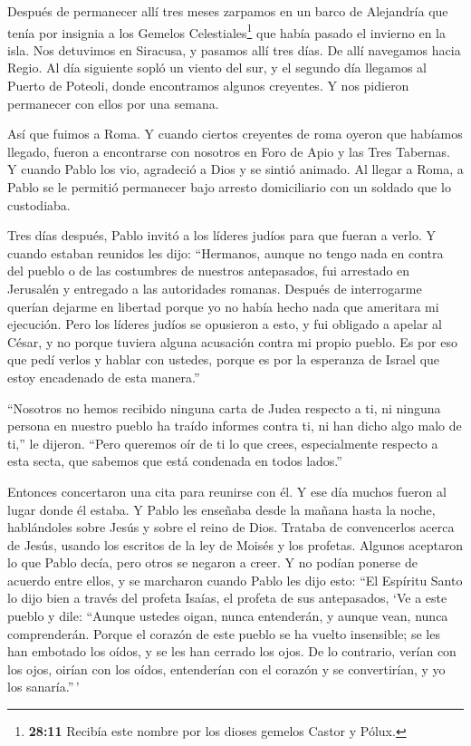  Después de permanecer allí tres meses zarpamos en un barco
de Alejandría que tenía por insignia a los Gemelos
Celestiales\footnote{\textbf{28:11} Recibía este nombre por los dioses
  gemelos Castor y Pólux.} que había pasado el invierno en la isla.
 Nos detuvimos en Siracusa, y pasamos allí tres días.
 De allí navegamos hacia Regio. Al día siguiente sopló un
viento del sur, y el segundo día llegamos al Puerto de Poteoli,
 donde encontramos algunos creyentes. Y nos pidieron
permanecer con ellos por una semana.

Así que fuimos a Roma.  Y cuando ciertos creyentes de roma
oyeron que habíamos llegado, fueron a encontrarse con nosotros en Foro
de Apio y las Tres Tabernas. Y cuando Pablo los vio, agradeció a Dios y
se sintió animado.  Al llegar a Roma, a Pablo se le
permitió permanecer bajo arresto domiciliario con un soldado que lo
custodiaba.

 Tres días después, Pablo invitó a los líderes judíos para
que fueran a verlo. Y cuando estaban reunidos les dijo: ``Hermanos,
aunque no tengo nada en contra del pueblo o de las costumbres de
nuestros antepasados, fui arrestado en Jerusalén y entregado a las
autoridades romanas.  Después de interrogarme querían
dejarme en libertad porque yo no había hecho nada que ameritara mi
ejecución.  Pero los líderes judíos se opusieron a esto, y
fui obligado a apelar al César, y no porque tuviera alguna acusación
contra mi propio pueblo.  Es por eso que pedí verlos y
hablar con ustedes, porque es por la esperanza de Israel que estoy
encadenado de esta manera.''

 ``Nosotros no hemos recibido ninguna carta de Judea
respecto a ti, ni ninguna persona en nuestro pueblo ha traído informes
contra ti, ni han dicho algo malo de ti,'' le dijeron. 
``Pero queremos oír de ti lo que crees, especialmente respecto a esta
secta, que sabemos que está condenada en todos lados.''

 Entonces concertaron una cita para reunirse con él. Y ese
día muchos fueron al lugar donde él estaba. Y Pablo les enseñaba desde
la mañana hasta la noche, hablándoles sobre Jesús y sobre el reino de
Dios. Trataba de convencerlos acerca de Jesús, usando los escritos de la
ley de Moisés y los profetas.  Algunos aceptaron lo que
Pablo decía, pero otros se negaron a creer.  Y no podían
ponerse de acuerdo entre ellos, y se marcharon cuando Pablo les dijo
esto: ``El Espíritu Santo lo dijo bien a través del profeta Isaías, el
profeta de sus antepasados,  `Ve a este pueblo y dile:
``Aunque ustedes oigan, nunca entenderán, y aunque vean, nunca
comprenderán.  Porque el corazón de este pueblo se ha
vuelto insensible; se les han embotado los oídos, y se les han cerrado
los ojos. De lo contrario, verían con los ojos, oirían con los oídos,
entenderían con el corazón y se convertirían, y yo los sanaría.''\,'

